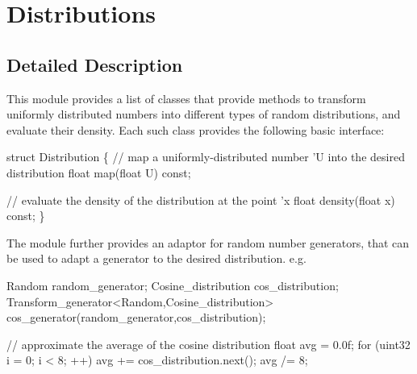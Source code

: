\hypertarget{group__distributions}{}\section{Distributions}
\label{group__distributions}


\subsection{Detailed Description}
\begin{DoxyParagraph}{}
This module provides a list of classes that provide methods to transform uniformly distributed numbers into different types of random distributions, and evaluate their density. Each such class provides the following basic interface\+: 
\begin{DoxyCode}
\textcolor{keyword}{struct }Distribution
\{
    \textcolor{comment}{// map a uniformly-distributed number 'U into the desired distribution}
    \textcolor{keywordtype}{float} map(\textcolor{keywordtype}{float} U) \textcolor{keyword}{const};

    \textcolor{comment}{// evaluate the density of the distribution at the point 'x}
    \textcolor{keywordtype}{float} density(\textcolor{keywordtype}{float} x) \textcolor{keyword}{const};
\}
\end{DoxyCode}
 
\end{DoxyParagraph}
\begin{DoxyParagraph}{}
The module further provides an adaptor for random number generators, that can be used to adapt a generator to the desired distribution. e.\+g. 
\begin{DoxyCode}
Random              random\_generator;
Cosine\_distribution cos\_distribution;
Transform\_generator<Random,Cosine\_distribution> cos\_generator(random\_generator,cos\_distribution);

\textcolor{comment}{// approximate the average of the cosine distribution}
\textcolor{keywordtype}{float} avg = 0.0f;
\textcolor{keywordflow}{for} (uint32 i = 0; i < 8; ++)
   avg += cos\_distribution.next();
avg /= 8;
\end{DoxyCode}
 
\end{DoxyParagraph}
